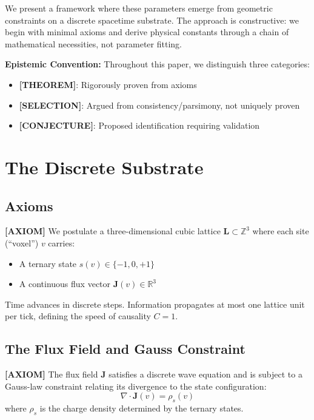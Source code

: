 \documentclass[aps,prd,twocolumn,10pt,groupedaddress,superscriptaddress]{revtex4-2}
\begin{document}
We present a framework where these parameters emerge from geometric constraints on a discrete spacetime substrate. The approach is constructive: we begin with minimal axioms and derive physical constants through a chain of mathematical necessities, not parameter fitting.

\textbf{Epistemic Convention:} Throughout this paper, we distinguish three categories:
\begin{itemize}
\item \textbf{[THEOREM]}: Rigorously proven from axioms
\item \textbf{[SELECTION]}: Argued from consistency/parsimony, not uniquely proven
\item \textbf{[CONJECTURE]}: Proposed identification requiring validation
\end{itemize}

\section{The Discrete Substrate}

\subsection{Axioms}

\textbf{[AXIOM]} We postulate a three-dimensional cubic lattice $\mathbf{L} \subset \mathbb{Z}^3$ where each site (``voxel'') $v$ carries:
\begin{itemize}
\item A ternary state $s(v) \in \{-1, 0, +1\}$
\item A continuous flux vector $\mathbf{J}(v) \in \mathbb{R}^3$
\end{itemize}

Time advances in discrete steps. Information propagates at most one lattice unit per tick, defining the speed of causality $C = 1$.

\subsection{The Flux Field and Gauss Constraint}

\textbf{[AXIOM]} The flux field $\mathbf{J}$ satisfies a discrete wave equation and is subject to a Gauss-law constraint relating its divergence to the state configuration:
\begin{equation}\label{eq:gauss}
\nabla \cdot \mathbf{J}(v) = \rho_s(v)
\end{equation}
where $\rho_s$ is the charge density determined by the ternary states.
\end{document}
